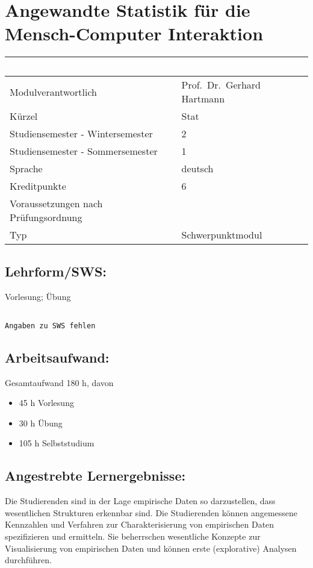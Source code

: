 \chapter{Angewandte Statistik für die Mensch-Computer
Interaktion}\label{angewandte-statistik-fuxfcr-die-mensch-computer-interaktion}

\begin{longtable}[]{@{}ll@{}}
\toprule
~ & ~\tabularnewline
\midrule
\endhead
Modulverantwortlich & Prof.~Dr.~Gerhard Hartmann\tabularnewline
Kürzel & Stat\tabularnewline
Studiensemester - Wintersemester & 2\tabularnewline
Studiensemester - Sommersemester & 1\tabularnewline
Sprache & deutsch\tabularnewline
Kreditpunkte & 6\tabularnewline
Voraussetzungen nach Prüfungsordnung &\tabularnewline
Typ & Schwerpunktmodul\tabularnewline
\bottomrule
\end{longtable}

\section*{Lehrform/SWS:}\label{lehrformsws-6}

Vorlesung; Übung

\begin{verbatim}

Angaben zu SWS fehlen
\end{verbatim}

\section*{Arbeitsaufwand:}\label{arbeitsaufwand-12}

Gesamtaufwand 180 h, davon

\begin{itemize}
\item
  45 h Vorlesung
\item
  30 h Übung
\item
  105 h Selbststudium
\end{itemize}

\section*{Angestrebte
Lernergebnisse:}\label{angestrebte-lernergebnisse-6}

Die Studierenden sind in der Lage empirische Daten so darzustellen, dass
wesentlichen Strukturen erkennbar sind. Die Studierenden können
angemessene Kennzahlen und Verfahren zur Charakterisierung von
empirischen Daten spezifizieren und ermitteln. Sie beherrschen
wesentliche Konzepte zur Visualisierung von empirischen Daten und können
erste (explorative) Analysen durchführen.

